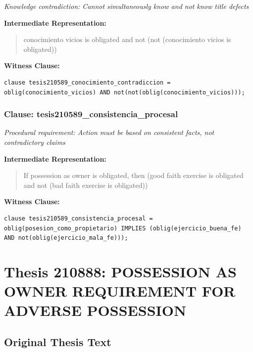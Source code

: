 \documentclass[11pt,a4paper]{article}
\begin{document}
\textit{Knowledge contradiction: Cannot simultaneously know and not know title defects}

\textbf{Intermediate Representation:}

\begin{quote}
conocimiento vicios is obligated and not (not (conocimiento vicios is obligated))
\end{quote}

\textbf{Witness Clause:}

\begin{lstlisting}[style=witnessstyle, language=Witness]
clause tesis210589_conocimiento_contradiccion = oblig(conocimiento_vicios) AND not(not(oblig(conocimiento_vicios)));
\end{lstlisting}

\subsubsection{Clause: tesis210589\_consistencia\_procesal}

\textit{Procedural requirement: Action must be based on consistent facts, not contradictory claims}

\textbf{Intermediate Representation:}

\begin{quote}
If possession as owner is obligated, then (good faith exercise is obligated and not (bad faith exercise is obligated))
\end{quote}

\textbf{Witness Clause:}

\begin{lstlisting}[style=witnessstyle, language=Witness]
clause tesis210589_consistencia_procesal = oblig(posesion_como_propietario) IMPLIES (oblig(ejercicio_buena_fe) AND not(oblig(ejercicio_mala_fe)));
\end{lstlisting}

\newpage

\section{Thesis 210888: POSSESSION AS OWNER REQUIREMENT FOR ADVERSE POSSESSION}
\label{thesis:210888}

\subsection{Original Thesis Text}
\end{document}
